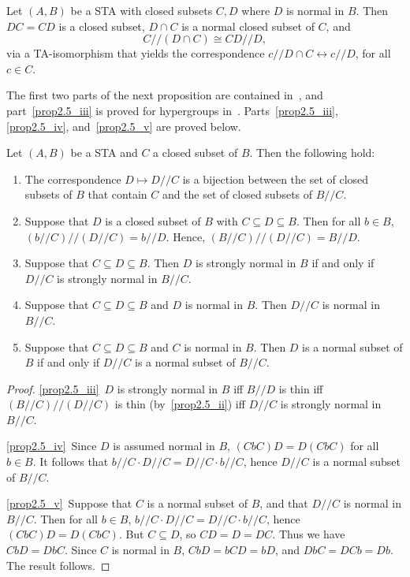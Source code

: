 \begin{lemm}
\label{lem:isom}
Let $(A, B)$ be a STA with closed subsets $C, D$ where $D$ is normal in
$B$. Then $DC = CD$ is a closed subset, $D\cap C$ is a normal closed
subset of $C$, and
\[
C//(D\cap C) \cong CD//D,
\] 
via a TA-isomorphism that yields the correspondence $c//D\cap C
\leftrightarrow c//D$, for all $c \in C$.
\end{lemm}


The first two parts of the next proposition are contained in~\cite
[Proposition 2.13]{BZ}, and part~\ref{prop2.5_iii} is proved for hypergroups in~\cite
[Lemma 4.6]{FZ}. Parts~\ref{prop2.5_iii}, \ref{prop2.5_iv}, and~\ref{prop2.5_v} are proved below.

\begin{prop}
\label{prop:subset_corresp}
Let $(A, B)$ be a STA and $C$ a closed subset of $B$. Then the
following hold:
\begin{enumerate}[label = \textup{(}\roman*\textup{)}] 
\item\label{prop2.5_i} The correspondence $D \mapsto D//C$ is a bijection between the set of
closed subsets of $B$ that contain $C$ and the set of closed subsets of
$B//C$.
\item\label{prop2.5_ii} Suppose that $D$ is a closed subset of $B$ with $C \subseteq D \subseteq
B$. Then for all $b \in B$, $(b//C)//(D//C) = b//D$. Hence,
$(B//C)//(D//C) = B//D$.
\item\label{prop2.5_iii} Suppose that $C \subseteq D \subseteq B$. Then $D$ is strongly normal
in $B$ if and only if $D//C$ is strongly normal in $B//C$.
\item\label{prop2.5_iv} Suppose that $C \subseteq D \subseteq B$ and $D$ is normal in $B$. Then
$D//C$ is normal in $B//C$.
\item\label{prop2.5_v} Suppose that $C \subseteq D \subseteq B$ and $C$ is normal in $B$. Then
$D$ is a normal subset of $B$ if and only if $D//C$ is a normal subset
of $B//C$.
\end{enumerate}
\end{prop}

\begin{proof}
\ref{prop2.5_iii}~$D$ is strongly normal in $B$ iff $B//D$ is thin iff
$(B//C)//(D//C)$ is thin (by~\ref{prop2.5_ii}) iff $D//C$ is strongly normal in
$B//C$. 
 
\ref{prop2.5_iv}~Since $D$ is assumed normal in $B$, $(CbC)D = D(CbC)$ for all $b \in
B$. It follows that $b//C\cdot D//C = D//C\cdot b//C$, hence $D//C$ is
a normal subset of $B//C$.
 
\ref{prop2.5_v}~Suppose that $C$ is a normal subset of $B$, and that $D//C$ is
normal in $B//C$. Then for all $b \in B$, $b//C\cdot D//C = D//C\cdot
b//C$, hence $(CbC)D = D(CbC)$. But $C \subseteq D$, so $CD = D = DC$.
Thus we have $CbD = DbC$. Since $C$ is normal in $B$, $CbD = bCD = bD$,
and $DbC = DCb = Db$. The result follows.
\end{proof}


